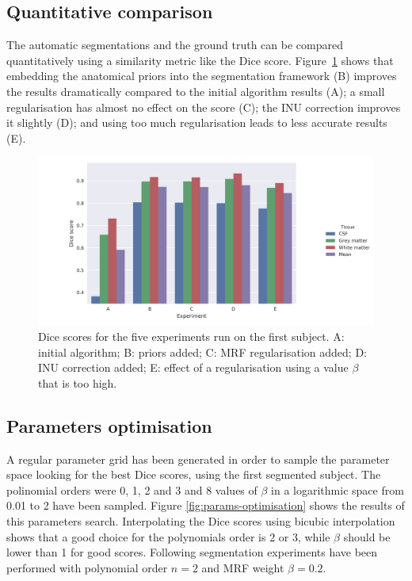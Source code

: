 \subsection{Quantitative comparison}
The automatic segmentations and the ground truth can be compared quantitatively using a similarity metric like the Dice score. Figure~\ref{fig:experiments} shows that embedding the anatomical priors into the segmentation framework (B) improves the results dramatically compared to the initial algorithm results (A); a small regularisation has almost no effect on the score (C); the INU correction improves it slightly (D); and using too much regularisation leads to less accurate results (E).

\begin{figure}
  \centering
  \includegraphics[width=\textwidth]{figures/experiments_dices_bars}
  \caption{Dice scores for the five experiments run on the first subject. A: initial algorithm; B: priors added; C: MRF regularisation added; D: INU correction added; E: effect of a regularisation using a value $\beta$ that is too high.}
  \label{fig:experiments}
\end{figure}




\subsection{Parameters optimisation}


A regular parameter grid has been generated in order to sample the parameter space looking for the best Dice scores, using the first segmented subject. The polinomial orders were 0, 1, 2 and 3 and 8 values of $\beta$ in a logarithmic space from 0.01 to 2 have been sampled. Figure \ref{fig:params-optimisation} shows the results of this parameters search. Interpolating the Dice scores using bicubic interpolation shows that a good choice for the polynomials order is 2 or 3, while $\beta$ should be lower than 1 for good scores. Following segmentation experiments have been performed with polynomial order $n = 2$ and MRF weight $\beta = 0.2$.



